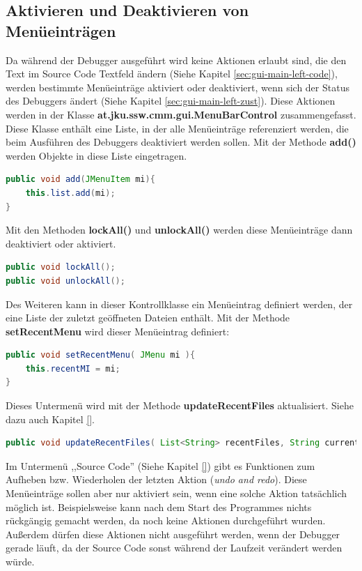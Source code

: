 \subsection{Aktivieren und Deaktivieren von Menüeinträgen}
\label{sec:gui-main-menu-ctrl}
Da während der Debugger ausgeführt wird keine Aktionen erlaubt sind, die den Text im Source Code Textfeld ändern (Siehe Kapitel \ref{sec:gui-main-left-code}), werden bestimmte Menüeinträge aktiviert oder deaktiviert, wenn sich der Status des Debuggers ändert (Siehe Kapitel \ref{sec:gui-main-left-zust}). Diese Aktionen werden in der Klasse \textbf{at.jku.ssw.cmm.gui.MenuBarControl} zusammengefasst. Diese Klasse enthält eine Liste, in der alle Menüeinträge referenziert werden, die beim Ausführen des Debuggers deaktiviert werden sollen. Mit der Methode \textbf{add()} werden Objekte in diese Liste eingetragen.
\begin{lstlisting}[language=JAVA]
public void add(JMenuItem mi){
	this.list.add(mi);
}
\end{lstlisting}

Mit den Methoden \textbf{lockAll()} und \textbf{unlockAll()} werden diese Menüeinträge dann deaktiviert oder aktiviert.

\begin{lstlisting}[language=JAVA]
public void lockAll();
public void unlockAll();
\end{lstlisting}

Des Weiteren kann in dieser Kontrollklasse ein Menüeintrag definiert werden, der eine Liste der zuletzt geöffneten Dateien enthält. Mit der Methode \textbf{setRecentMenu} wird dieser Menüeintrag definiert:
\begin{lstlisting}[language=JAVA]
public void setRecentMenu( JMenu mi ){
	this.recentMI = mi;
}
\end{lstlisting}

Dieses Untermenü wird mit der Methode \textbf{updateRecentFiles} aktualisiert. Siehe dazu auch Kapitel \ref{}.
\begin{lstlisting}[language=JAVA]
public void updateRecentFiles( List<String> recentFiles, String currentFile );
\end{lstlisting}

Im Untermenü ,,Source Code'' (Siehe Kapitel \ref{}) gibt es Funktionen zum Aufheben bzw. Wiederholen der letzten Aktion (\emph{undo and redo}). Diese Menüeinträge sollen aber nur aktiviert sein, wenn eine solche Aktion tatsächlich möglich ist. Beispielsweise kann nach dem Start des Programmes nichts rückgängig gemacht werden, da noch keine Aktionen durchgeführt wurden. Außerdem dürfen diese Aktionen nicht ausgeführt werden, wenn der Debugger gerade läuft, da der Source Code sonst während der Laufzeit verändert werden würde.

